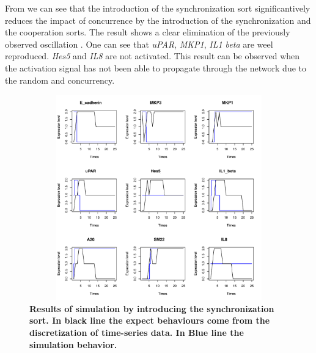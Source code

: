 From  we can see that the introduction of the synchronization sort significantively reduces the 
impact of concurrence by the introduction of the synchronization and the cooperation sorts. The result shows  a 
clear elimination of the previously observed oscillation . One can see that \emph{uPAR}, \emph{MKP1},
\emph{IL1 beta} are weel reproduced. \emph{Hes5} and \emph{IL8} are not activated. This result can be observed when the activation
signal has not been able to propagate through the network due to the random and concurrency.


\begin{figure}[!t]
\centering
\includegraphics[width=6.5in,height=3.5in]{images/resultWS.pdf}
\caption{\bf Results of simulation by introducing the synchronization sort. In black line the expect behaviours
come from the discretization of time-series data. In Blue line the simulation behavior.}
\label{fig:rws}
\end{figure}



%
%

